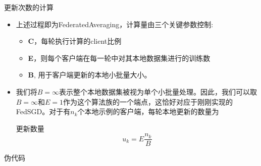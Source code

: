 \documentclass{beamer}
\begin{document}
\begin{frame}{\songti 更新次数的计算}
\begin{itemize}
    \item 上述过程即为FederatedAveraging，计算量由三个关键参数控制:
    \begin{itemize}
        \item \textbf{C}，每轮执行计算的client比例
        \item \textbf{E}，则每个客户端在每一轮中对其本地数据集进行的训练数
        \item \textbf{B}, 用于客户端更新的本地小批量大小。
    \end{itemize}
    \item 我们将$B =\infty$表示整个本地数据集被视为单个小批量处理。因此，我们可以取$B =\infty$和$E = 1$作为这个算法族的一个端点，这恰好对应于刚刚实现的FedSGD。对于有$n_k$个本地示例的客户端，每轮本地更新的数量为\\
    \centering
    \begin{minipage}{0.6\textwidth}
    \begin{block}{\songti \fontsize{9pt}{9pt} 更新数量}
        \begin{equation}
            u_k = E \frac{n_k}{B}
        \end{equation}
    \end{block}
    \end{minipage}
\end{itemize}
\end{frame}
\begin{frame}{\songti 伪代码}
\end{frame}
\end{document}
